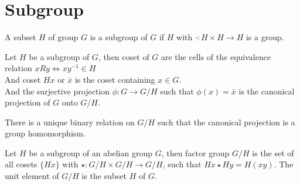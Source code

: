 \section{Subgroup}
	\begin{definition}
		A subset $H$ of group $G$ is a subgroup of $G$ if $H$ with $\cdot : H \times H \to H$ is a group.
	\end{definition}
	\begin{definition}
		Let $H$ be a subgroup of $G$, then coset of $G$ are the cells of the equivalence relation $xRy \iff xy^{-1} \in H$\\
		And coset $Hx$ or $\bar{x}$ is the coset containing $x \in G$.\\
		And the surjective projection $\phi : G \to G/H$ such that $\phi(x) = \bar{x}$ is the canonical projection of $G$ onto $G/H$.
	\end{definition}
	\begin{remark}
		There is a unique binary relation on $G/H$ such that the canonical projection is a group homomorphism.
	\end{remark}
	\begin{definition}
		Let $H$ be a subgroup of an abelian group $G$, then factor group $G/H$ is the set of all cosets $\{Hx\}$ with $\star: G/H \times G/H \to G/H$, such that $Hx \star Hy = H(xy)$. The unit element of $G/H$ is the subset $H$ of $G$.
	\end{definition}
